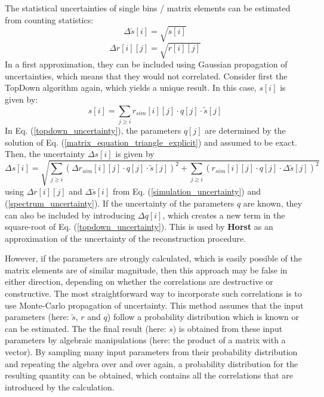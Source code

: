 \documentclass{article}
\begin{document}
The statistical uncertainties of single bins / matrix elements can be estimated from counting statistics:
%
\begin{equation}
	\label{spectrum_uncertainty}
	\Delta \tilde{s} [i] = \sqrt{ s[i] }
\end{equation}
\begin{equation}
	\label{simulation_uncertainty}
	\Delta r [i][j] = \sqrt{ r[i][j] }
\end{equation}
%
In a first approximation, they can be included using Gaussian propagation of uncertainties, which means that they would not correlated.
Consider first the TopDown algorithm again, which yields a unique result.
In this case, $s[i]$ is given by:
%
\begin{equation}
	\label{topdown_uncertainty}
	s[i] = \sum_{j \geq i} r_{sim}[i][j] \cdot q[j] \cdot \tilde{s}[j]
\end{equation}
%
In Eq. (\ref{topdown_uncertainty}), the parameters $q[j]$ are determined by the solution of Eq. (\ref{matrix_equation_triangle_explicit}) and assumed to be exact.
Then, the uncertainty $\Delta s[i]$ is given by
%
\begin{equation}
	\label{topdown_uncertainty}
	\Delta s[i] = \sqrt{\sum_{j \geq i} \left( \Delta r_{sim}[i][j] \cdot q[j] \cdot \tilde{s}[j] \right)^2 + \sum_{j \geq i} \left( r_{sim}[i][j] \cdot q[j] \cdot \Delta \tilde{s}[j] \right)^2}
\end{equation}
%
using $\Delta r[i][j]$ and $\Delta \tilde{s} [i]$ from Eq. (\ref{simulation_uncertainty}) and (\ref{spectrum_uncertainty}).
If the uncertainty of the parameters $q$ are known, they can also be included by introducing $\Delta q[i]$, which creates a new term in the square-root of Eq. (\ref{topdown_uncertainty}).
This is used by \textbf{Horst} as an approximation of the uncertainty of the reconstruction procedure.

However, if the parameters are strongly calculated, which is easily possible of the matrix elements are of similar magnitude, then this approach may be false in either direction, depending on whether the correlations are destructive or constructive.
The most straightforward way to incorporate such correlations is to use Monte-Carlo propagation of uncertainty.
This method assumes that the input parameters (here: $\tilde{s}$, $r$ and $q$) follow a probability distribution which is known or can be estimated.
The the final result (here: $s$) is obtained from these input parameters by algebraic manipulations (here: the product of a matrix with a vector).
By sampling many input parameters from their probability distribution and repeating the algebra over and over again, a probability distribution for the resulting quantity can be obtained, which contains all the correlations that are introduced by the calculation.
\end{document}

